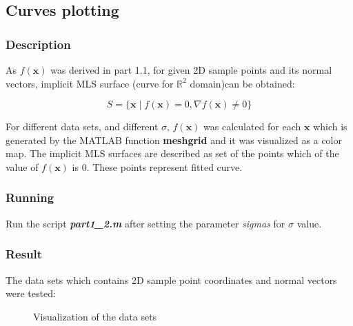 \documentclass[paper=a4, fontsize=11pt]{scrartcl} %
\numberwithin{equation}{section} %
\numberwithin{figure}{section} %
\numberwithin{table}{section} %
\newcommand{\filename}[1]{\textbf{\textit{#1}}}
\newcommand{\funcname}[1]{\textbf{#1}}
\renewcommand{\vec}[1]{\mathbf{#1}}
\begin{document}
\subsection{Curves plotting}

\subsubsection{Description}

As $f(\vec{x})$ was derived in part 1.1, for given 2D sample points and its normal vectors, implicit MLS surface (curve for $\mathbb{R}^2$ domain)can be obtained:

\begin{equation}
S = \{ \vec{x} \mid f(\vec{x}) = 0, \nabla f(\vec{x}) \neq 0 \}	
\end{equation}

For different data sets, and different $\sigma$, $f(\vec{x})$ was calculated for each $\vec{x}$ which is generated by the MATLAB function \funcname{meshgrid} and it was visualized as a color map. The implicit MLS surfaces are described as set of the points which of the value of $f(\vec{x})$ is $0$. These points represent fitted curve.  

\subsubsection{Running}

Run the script \filename{part1\_2.m} after setting the parameter \textit{sigmas} for $\sigma$ value. 

\subsubsection{Result}

The data sets which contains 2D sample point coordinates and normal vectors were tested: 

\begin{figure}[H]
\caption{Visualization of the data sets\label{fig:simple}}
\noindent{}
\end{figure} 
\end{document}
